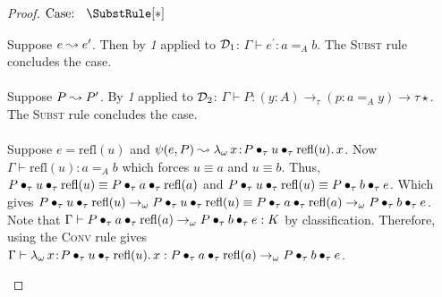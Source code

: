 \begin{proof}
    $\text{Case: }\begin{array}{c} \SubstRule[*] \end{array}$
    \begin{proofcase}
        Suppose $e \leadsto e^\prime$.
        Then by \textit{1} applied to $\mathcal{D}_{1}$: $\Gamma \vdash e^\prime : a =_A b$.
        The \textsc{Subst} rule concludes the case.
        \\ \\
        Suppose $P \leadsto P^\prime$.
        By \textit{1} applied to $\mathcal{D}_{2}$: $\Gamma \vdash P : (y : A) \to_\tau (p : a =_A y) \to\tau \star$.
        The \textsc{Subst} rule concludes the case.
        \\ \\
        Suppose $e = \text{refl}(u)$ and $\psi(e, P) \leadsto {\lambda_\omega}\, x\! : \! P \bullet_{\tau} u \bullet_{\tau} \text{refl}(u).\, x$.
        Now $\Gamma \vdash \text{refl}(u) : a =_A b$ which forces $u \equiv a$ and $u \equiv b$.
        Thus, $P \bullet_{\tau} u \bullet_{\tau} \text{refl}(u) \equiv P \bullet_{\tau} a \bullet_{\tau} \text{refl}(a)$ and $P \bullet_{\tau} u \bullet_{\tau} \text{refl}(u) \equiv P \bullet_{\tau} b \bullet_{\tau} e$.
        Which gives $P \bullet_{\tau} u \bullet_{\tau} \text{refl}(u) \to_\omega P \bullet_{\tau} u \bullet_{\tau} \text{refl}(u) \equiv P \bullet_{\tau} a \bullet_{\tau} \text{refl}(a) \to_\omega P \bullet_{\tau} b \bullet_{\tau} e$.
        Note that $\Gamma \vdash P \bullet_{\tau} a \bullet_{\tau} \text{refl}(a) \to_\omega P \bullet_{\tau} b \bullet_{\tau} e : K$ by classification.
        Therefore, using the \textsc{Conv} rule gives $\Gamma \vdash {\lambda_\omega}\, x\! : \! P \bullet_{\tau} u \bullet_{\tau} \text{refl}(u).\, x : P \bullet_{\tau} a \bullet_{\tau} \text{refl}(a) \to_\omega P \bullet_{\tau} b \bullet_{\tau} e$.
    \end{proofcase}


\end{proof}
